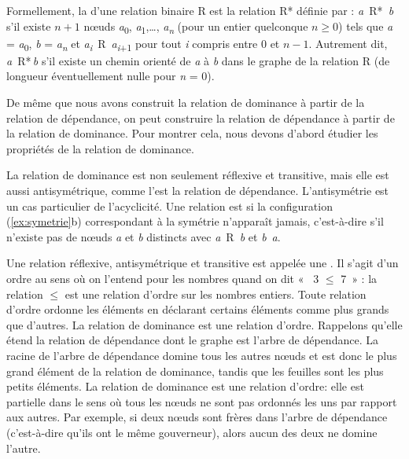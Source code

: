{    Formellement, la  d’une relation binaire R est la relation R* définie par : \textit{a~}R*\textit{~b} s’il existe $n+1$ nœuds \textit{a}\textsubscript{0}, \textit{a}\textsubscript{1},…, \textit{a\textsubscript{n}} (pour un entier quelconque $n \geq 0$) tels que \textit{a} = \textit{a}\textsubscript{0}, \textit{b} = \textit{a\textsubscript{n}} et \textit{a\textsubscript{i}}~R~\textit{a\textsubscript{i}}\textsubscript{+1} pour tout \textit{i} compris entre 0 et $n-1$. Autrement dit, \textit{a}~R*\,\textit{b} s’il existe un chemin orienté de \textit{a} à \textit{b} dans le graphe de la relation R (de longueur éventuellement nulle pour \textit{n} = 0).

    De même que nous avons construit la relation de dominance à partir de la relation de dépendance, on peut construire la relation de dépendance à partir de la relation de dominance. Pour montrer cela, nous devons d'abord étudier les propriétés de la relation de dominance. 
    
    La relation de dominance est non seulement réflexive et transitive, mais elle est aussi antisymétrique, comme l’est la relation de dépendance. L’antisymétrie est un cas particulier de l’acyclicité. Une relation est  si la configuration (\ref{ex:symetrie}b) correspondant à la symétrie n’apparaît jamais, c’est-à-dire s’il n’existe pas de nœuds \textit{a} et \textit{b} distincts avec \textit{a}~R~\textit{b} et \textit{b}~\textit{a}.

    Une relation réflexive, antisymétrique et transitive est appelée une . Il s’agit d’un ordre au sens où on l’entend pour les nombres quand on dit «~ 3 ${\leq}$ 7~» : la relation ${\leq}$ est une relation d’ordre sur les nombres entiers. Toute relation d’ordre ordonne les éléments en déclarant certains éléments comme plus grands que d’autres.
La relation de dominance est une relation d’ordre. Rappelons qu’elle étend la relation de dépendance dont le graphe est l’arbre de dépendance. La racine de l'arbre de dépendance domine tous les autres nœuds et est donc le plus grand élément de la relation de dominance, tandis que les feuilles sont les plus petits éléments. 
La relation de dominance est une relation d’ordre: elle est partielle dans le sens où tous les nœuds ne sont pas ordonnés les uns par rapport aux autres. Par exemple, si deux nœuds sont frères dans l’arbre de dépendance (c’est-à-dire qu’ils ont le même gouverneur), alors aucun des deux ne domine l’autre.

}
